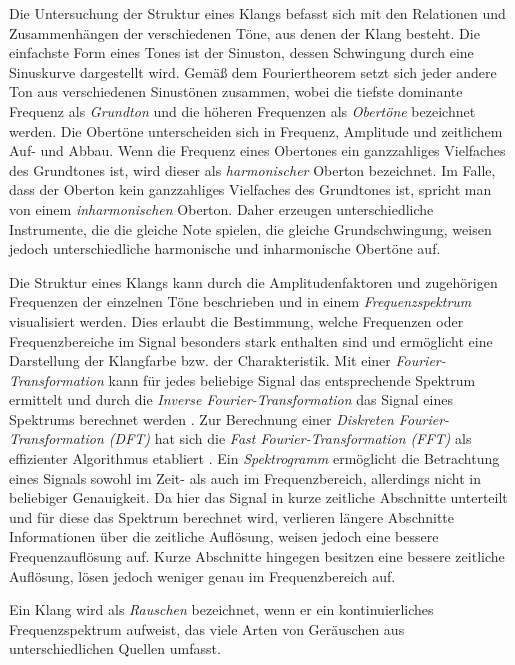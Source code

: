 \documentclass[
  a4paper,  %
  twoside,  %
  bibliography=totoc,
  headsepline,
  cleardoublepage=empty,
  parskip=half,
  draft=false
]{scrbook}
\begin{document}
Die Untersuchung der Struktur eines Klangs befasst sich mit den Relationen und Zusammenhängen der verschiedenen Töne, aus denen der Klang besteht. Die einfachste Form eines Tones ist der Sinuston, dessen Schwingung durch eine Sinuskurve dargestellt wird. Gemäß dem Fouriertheorem setzt sich jeder andere Ton aus verschiedenen Sinustönen zusammen, wobei die tiefste dominante Frequenz als \emph{Grundton} und die höheren Frequenzen als \emph{Obertöne} bezeichnet werden. Die Obertöne unterscheiden sich in Frequenz, Amplitude und zeitlichem Auf- und Abbau. Wenn die Frequenz eines Obertones ein ganzzahliges Vielfaches des Grundtones ist, wird dieser als \emph{harmonischer} Oberton bezeichnet. Im Falle, dass der Oberton kein ganzzahliges Vielfaches des Grundtones ist, spricht man von einem \emph{inharmonischen} Oberton. Daher erzeugen unterschiedliche Instrumente, die die gleiche Note spielen, die gleiche Grundschwingung, weisen jedoch unterschiedliche harmonische und inharmonische Obertöne auf. \cite{parker_good_2009, white_physics_2014, ruschkowski_elektronische_2019}

Die Struktur eines Klangs kann durch die Amplitudenfaktoren und zugehörigen Frequenzen der einzelnen Töne beschrieben und in einem \emph{Frequenzspektrum} visualisiert werden. Dies erlaubt die Bestimmung, welche Frequenzen oder Frequenzbereiche im Signal besonders stark enthalten sind und ermöglicht eine Darstellung der Klangfarbe bzw. der Charakteristik. Mit einer \emph{Fourier-Transformation} kann für jedes beliebige Signal das entsprechende Spektrum ermittelt und durch die \emph{Inverse Fourier-Transformation} das Signal eines Spektrums berechnet werden \cite{raffaseder_audiodesign_2010}. Zur Berechnung einer \emph{Diskreten Fourier-Transformation (DFT)} hat sich die \emph{Fast Fourier-Transformation (FFT)} als effizienter Algorithmus etabliert \cite{heideman_gauss_1985}. Ein \emph{Spektrogramm} ermöglicht die Betrachtung eines Signals sowohl im Zeit- als auch im Frequenzbereich, allerdings nicht in beliebiger Genauigkeit. Da hier das Signal in kurze zeitliche Abschnitte unterteilt und für diese das Spektrum berechnet wird, verlieren längere Abschnitte Informationen über die zeitliche Auflösung, weisen jedoch eine bessere Frequenzauflösung auf. Kurze Abschnitte hingegen besitzen eine bessere zeitliche Auflösung, lösen jedoch weniger genau im Frequenzbereich auf. \cite{raffaseder_audiodesign_2010}

Ein Klang wird als \emph{Rauschen} bezeichnet, wenn er ein kontinuierliches Frequenzspektrum aufweist, das viele Arten von Geräuschen aus unterschiedlichen Quellen umfasst.  
\cite{tsuji_physics_2021}
\end{document}
